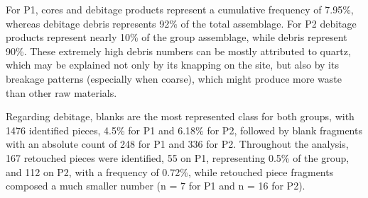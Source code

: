 \documentclass[12pt,twoside]{reedthesis}
\begin{document}
For P1, cores and debitage products represent a cumulative frequency of 7.95\%, whereas debitage debris represents 92\% of the total assemblage. For P2 debitage products represent nearly 10\% of the group assemblage, while debris represent 90\%. These extremely high debris numbers can be mostly attributed to quartz, which may be explained not only by its knapping on the site, but also by its breakage patterns (especially when coarse), which might produce more waste than other raw materials.

Regarding debitage, blanks are the most represented class for both groups, with 1476 identified pieces, 4.5\% for P1 and 6.18\% for P2, followed by blank fragments with an absolute count of 248 for P1 and 336 for P2. Throughout the analysis, 167 retouched pieces were identified, 55 on P1, representing 0.5\% of the group, and 112 on P2, with a frequency of 0.72\%, while retouched piece fragments composed a much smaller number (n = 7 for P1 and n = 16 for P2).
\end{document}
